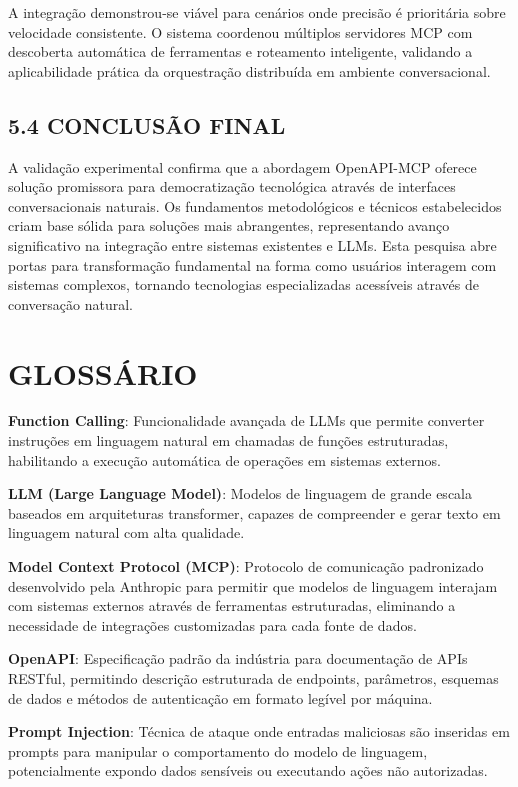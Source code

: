 \documentclass[
]{article}
\begin{document}
A integração demonstrou-se viável para cenários onde precisão é
prioritária sobre velocidade consistente. O sistema coordenou múltiplos
servidores MCP com descoberta automática de ferramentas e roteamento
inteligente, validando a aplicabilidade prática da orquestração
distribuída em ambiente conversacional.

\subsection{5.4 CONCLUSÃO FINAL}\label{conclusuxe3o-final}

A validação experimental confirma que a abordagem OpenAPI-MCP oferece
solução promissora para democratização tecnológica através de interfaces
conversacionais naturais. Os fundamentos metodológicos e técnicos
estabelecidos criam base sólida para soluções mais abrangentes,
representando avanço significativo na integração entre sistemas
existentes e LLMs. Esta pesquisa abre portas para transformação
fundamental na forma como usuários interagem com sistemas complexos,
tornando tecnologias especializadas acessíveis através de conversação
natural.

\section{GLOSSÁRIO}\label{glossuxe1rio}

\textbf{Function Calling}: Funcionalidade avançada de LLMs que permite
converter instruções em linguagem natural em chamadas de funções
estruturadas, habilitando a execução automática de operações em sistemas
externos.

\textbf{LLM (Large Language Model)}: Modelos de linguagem de grande
escala baseados em arquiteturas transformer, capazes de compreender e
gerar texto em linguagem natural com alta qualidade.

\textbf{Model Context Protocol (MCP)}: Protocolo de comunicação
padronizado desenvolvido pela Anthropic para permitir que modelos de
linguagem interajam com sistemas externos através de ferramentas
estruturadas, eliminando a necessidade de integrações customizadas para
cada fonte de dados.

\textbf{OpenAPI}: Especificação padrão da indústria para documentação de
APIs RESTful, permitindo descrição estruturada de endpoints, parâmetros,
esquemas de dados e métodos de autenticação em formato legível por
máquina.

\textbf{Prompt Injection}: Técnica de ataque onde entradas maliciosas
são inseridas em prompts para manipular o comportamento do modelo de
linguagem, potencialmente expondo dados sensíveis ou executando ações
não autorizadas.
\end{document}
